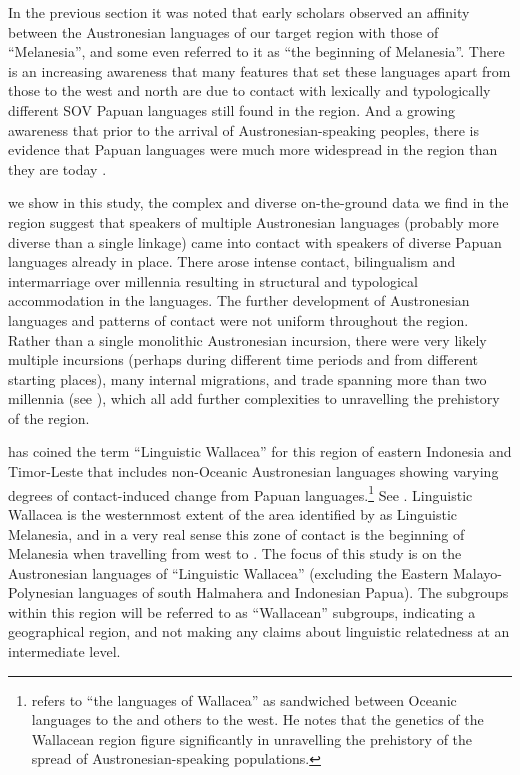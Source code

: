 In the previous section it was noted that early scholars observed an affinity
between the Austronesian languages of our target region with those of “Melanesia”,
and some even referred to it as “the beginning of Melanesia”.
There is an increasing awareness that many features that set these languages apart from those to the west
and north are due to contact with lexically
and typologically different SOV Papuan languages still found in the region.
And a growing awareness that prior to the arrival of Austronesian-speaking peoples,
there is evidence that Papuan languages were much
more widespread in the region than they are today
\citep{Grimes1991a,Grimes2000a,GrimesCIP,GrimesTherikGrimesJacob1997,
KlamerReesinkVanStaden2008,DonohueGrimes2008,Schapper2015,Schapper2024,Klamer2019}.

 we show in this study,
the complex and diverse on-the-ground data we find in the region suggest
that speakers of multiple Austronesian languages
(probably more diverse than a single linkage)
came into contact with speakers of diverse Papuan languages already in place.
There arose intense contact, bilingualism
and intermarriage over millennia resulting in structural
and typological accommodation in the languages.
The further development of Austronesian languages
and patterns of contact were not uniform throughout the region.
Rather than a single monolithic Austronesian incursion,
there were very likely multiple incursions (perhaps during different time periods
and from different starting places),
many internal migrations,
and trade spanning more than two millennia (see ),
which all add further complexities to unravelling the prehistory of the region.

\citet{Schapper2015} has coined the term ``Linguistic Wallacea''
for this region of eastern Indonesia
and Timor-Leste that includes non-Oceanic Austronesian languages
showing varying degrees of contact-induced change from Papuan languages.\footnote{
		\citet[59]{Oppenheimer2003} refers to “the languages of Wallacea”
		as sandwiched between Oceanic languages to the  and others to the west.
		He notes that the genetics of the Wallacean region figure significantly
		in unravelling the prehistory of the spread of Austronesian-speaking populations.}
See .
Linguistic Wallacea is the westernmost extent of the area identified by \citet{Schapper2015}
as Linguistic Melanesia, and in a very real sense this
zone of contact is the beginning of Melanesia when travelling from west to .
The focus of this study is on the Austronesian languages of “Linguistic Wallacea”
(excluding the Eastern Malayo-Polynesian languages of south Halmahera and Indonesian Papua).
The subgroups within this region will be referred to as “Wallacean” subgroups,
indicating a geographical region,
and not making any claims about linguistic relatedness at an intermediate level.


